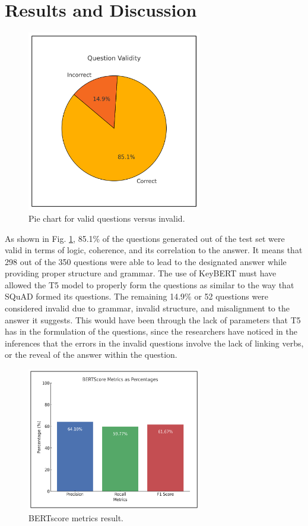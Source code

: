 \documentclass[conference]{IEEEtran}
\begin{document}
\section{Results and Discussion}
\begin{figure}[H]
    \centerline{\includegraphics[width=3in]{validity.png}}
    \vspace{-0.4cm}
    \caption{Pie chart for valid questions versus invalid.} 
    \label{validity}
\end{figure}
As shown in Fig. \ref{validity}, 85.1\% of the questions generated out of 
the test set were valid in terms of logic, coherence, and 
its correlation to the answer. It means that 298 out of the 350 
questions were able to lead to the designated answer while 
providing proper structure and grammar. The use of KeyBERT 
must have allowed the T5 model to properly form the questions 
as similar to the way that SQuAD formed its questions. The 
remaining 14.9\% or 52 questions were considered invalid 
due to grammar, invalid structure, and misalignment to the 
answer it suggests. This would have been through the lack 
of parameters that T5 has in the formulation of the questions, 
since the researchers have noticed in the inferences that 
the errors in the invalid questions involve the lack of 
linking verbs, or the reveal of the answer within the question. 
\begin{figure}[H]
    \centerline{\includegraphics[width=3in]{bertscore.png}}
    \vspace{-0.4cm}
    \caption{BERTscore metrics result.}
    \label{bertscore}
\end{figure}
\end{document}
